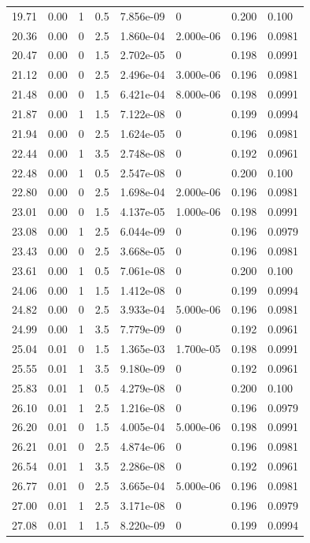 \documentclass[preview]{standalone}
\begin{document}
{{{\begin{tabular}{L{1.2cm}C{1.2cm} C{0.3cm}C{0.5cm} C{1.4cm}C{1.4cm} C{1.4cm}C{1.4cm}}
  19.71  &  0.00  & 1     & 0.5 &  7.856e-09  & 0  & 0.200 &  0.100   \\ 
  20.36  &  0.00  & 0     & 2.5 &  1.860e-04  & 2.000e-06  & 0.196 &  0.0981   \\ 
  20.47  &  0.00  & 0     & 1.5 &  2.702e-05  & 0  & 0.198 &  0.0991   \\ 
  21.12  &  0.00  & 0     & 2.5 &  2.496e-04  & 3.000e-06  & 0.196 &  0.0981   \\ 
  21.48  &  0.00  & 0     & 1.5 &  6.421e-04  & 8.000e-06  & 0.198 &  0.0991   \\ 
  21.87  &  0.00  & 1     & 1.5 &  7.122e-08  & 0  & 0.199 &  0.0994   \\ 
  21.94  &  0.00  & 0     & 2.5 &  1.624e-05  & 0  & 0.196 &  0.0981   \\ 
  22.44  &  0.00  & 1     & 3.5 &  2.748e-08  & 0  & 0.192 &  0.0961   \\ 
  22.48  &  0.00  & 1     & 0.5 &  2.547e-08  & 0  & 0.200 &  0.100   \\ 
  22.80  &  0.00  & 0     & 2.5 &  1.698e-04  & 2.000e-06  & 0.196 &  0.0981   \\ 
  23.01  &  0.00  & 0     & 1.5 &  4.137e-05  & 1.000e-06  & 0.198 &  0.0991   \\ 
  23.08  &  0.00  & 1     & 2.5 &  6.044e-09  & 0  & 0.196 &  0.0979   \\ 
  23.43  &  0.00  & 0     & 2.5 &  3.668e-05  & 0  & 0.196 &  0.0981   \\ 
  23.61  &  0.00  & 1     & 0.5 &  7.061e-08  & 0  & 0.200 &  0.100   \\ 
  24.06  &  0.00  & 1     & 1.5 &  1.412e-08  & 0  & 0.199 &  0.0994   \\ 
  24.82  &  0.00  & 0     & 2.5 &  3.933e-04  & 5.000e-06  & 0.196 &  0.0981   \\ 
  24.99  &  0.00  & 1     & 3.5 &  7.779e-09  & 0  & 0.192 &  0.0961   \\ 
  25.04  &  0.01  & 0     & 1.5 &  1.365e-03  & 1.700e-05  & 0.198 &  0.0991   \\ 
  25.55  &  0.01  & 1     & 3.5 &  9.180e-09  & 0  & 0.192 &  0.0961   \\ 
  25.83  &  0.01  & 1     & 0.5 &  4.279e-08  & 0  & 0.200 &  0.100   \\ 
  26.10  &  0.01  & 1     & 2.5 &  1.216e-08  & 0  & 0.196 &  0.0979   \\ 
  26.20  &  0.01  & 0     & 1.5 &  4.005e-04  & 5.000e-06  & 0.198 &  0.0991   \\ 
  26.21  &  0.01  & 0     & 2.5 &  4.874e-06  & 0  & 0.196 &  0.0981   \\ 
  26.54  &  0.01  & 1     & 3.5 &  2.286e-08  & 0  & 0.192 &  0.0961   \\ 
  26.77  &  0.01  & 0     & 2.5 &  3.665e-04  & 5.000e-06  & 0.196 &  0.0981   \\ 
  27.00  &  0.01  & 1     & 2.5 &  3.171e-08  & 0  & 0.196 &  0.0979   \\ 
  27.08  &  0.01  & 1     & 1.5 &  8.220e-09  & 0  & 0.199 &  0.0994   \\ 
\hline 
\end{tabular} 

}}}
\end{document}
